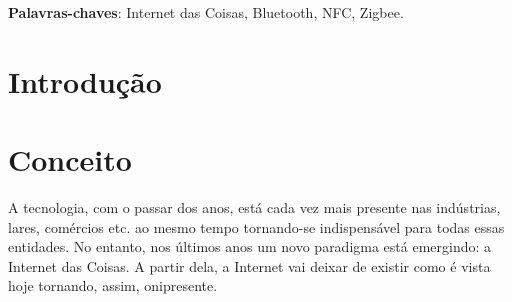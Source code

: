 \documentclass[
	article,			%
	11pt,				%
	oneside,			%
	a4paper,			%
	section=TITLE,		%
	subsection=TITLE,	%
	english,			%
	brazil,				%
	sumario=tradicional
	]{abntex2}
\begin{document}
\frenchspacing 


%
%
\maketitle

\begin{resumoumacoluna}
 
 \vspace{\onelineskip}
 
 \noindent
 \textbf{Palavras-chaves}: Internet das Coisas, Bluetooth, NFC, Zigbee.
\end{resumoumacoluna}


\textual

\section*{Introdução}








\section{Conceito}




A tecnologia, com o passar dos anos, está cada vez mais presente nas indústrias, lares, comércios 
etc. ao mesmo tempo tornando-se indispensável para todas essas entidades. No entanto, nos últimos 
anos um novo paradigma está emergindo: a Internet das Coisas. A partir dela, a Internet vai deixar 
de existir como é vista hoje tornando, assim, onipresente.
\end{document}
